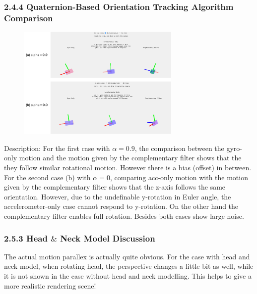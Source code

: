 \documentclass[11pt]{article}
\begin{document}
\subsubsection*{2.4.4 Quaternion-Based Orientation Tracking Algorithm Comparison}
\begin{figure}[h!t]
    \centering\includegraphics[width=0.7\textwidth]{figures/fig_quaternion1.png}
\end{figure}
Description: For the first case with $\alpha=0.9$, the comparison between the gyro-only motion and the motion given by the complementary filter shows that the they follow similar rotational motion. However there is a bias (offset) in between. For the second case (b) with $\alpha=0$, comparing acc-only motion with the motion given by the complementary filter shows that the z-axis follows the same orientation. However, due to the undefinable y-rotation in Euler angle, the accelerometer-only case cannot respond to y-rotation. On the other hand the complementary filter enables full rotation. Besides both cases show large noise. 

\subsubsection*{2.5.3 Head $\&$ Neck Model Discussion}
The actual motion parallex is actually quite obvious. For the case with head and neck model, when rotating head, the perspective changes a little bit as well, while it is not shown in the case without head and neck modelling. This helps to give a more realistic rendering scene! 
\end{document}
